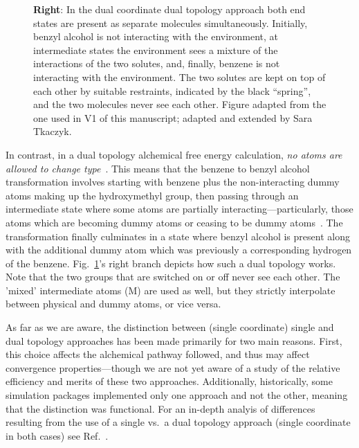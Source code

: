 \documentclass[9pt,bestpractices,pubversion]{livecoms}
\newcommand{\sbnote}[1]{%
  {\bfseries{}[SB: }%
  {\textcolor{blue}{#1}}{\bfseries{}]}
  }
\begin{document}
\begin{figure}
{      %
\textbf{Right}: In the dual coordinate dual topology approach both end states are present as separate molecules simultaneously.  Initially, benzyl alcohol is not interacting with the environment, at intermediate states the environment sees a mixture of the interactions of the two solutes, and, finally, benzene is not interacting with the environment. The two solutes are kept on top of each other by suitable restraints, indicated by the black ``spring'', and  the two molecules never see each other.  Figure adapted from the one used in V1 of this manuscript; adapted and extended by Sara Tkaczyk.
    }
    \label{fig:fig_topology}
\end{figure} 

In contrast, in a dual topology alchemical free energy calculation, \emph{no atoms are allowed to change type}~\cite{boresch1999role, shirts2012best}. This means that the benzene to benzyl alcohol transformation involves starting with benzene plus the non-interacting dummy atoms making up the hydroxymethyl group, then passing through an intermediate state where some atoms are partially interacting---particularly, those atoms which are becoming dummy atoms or ceasing to be dummy atoms~\cite{mobley2014blind}. The transformation finally culminates in a state where benzyl alcohol is present along with the additional dummy atom which was previously a corresponding hydrogen of the benzene. Fig.~\ref{fig:fig_topology}'s right branch depicts how such a dual topology works. Note that the two groups that are switched on or off never see each other. The 'mixed' intermediate atoms (M) are used as well, but they strictly interpolate between physical and dummy atoms, or vice versa.


As far as we are aware, the distinction between (single coordinate) single and dual topology approaches has been made primarily for two main reasons. First, this choice affects the alchemical pathway followed, and thus may affect convergence properties---though we are not yet aware of a study of the relative efficiency and merits of these two approaches. Additionally, historically, some simulation packages implemented only one approach and not the other, meaning that the distinction was functional. For an in-depth analyis of differences resulting from the use of a  single vs.\ a dual topology approach (single coordinate in both cases) see Ref.~\cite{Boresch_2002}.
\end{document}
